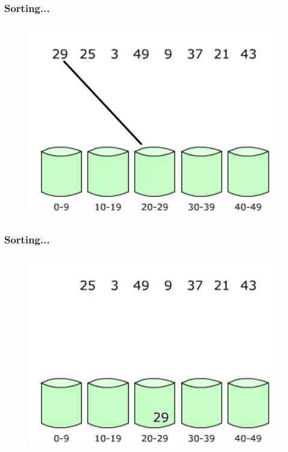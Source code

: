 \documentclass[pdf]{beamer}
\begin{document}
\begin{frame}
	\frametitle{Sorting...}
	\begin{figure}
		\includegraphics[scale=.3]{Figure/1.png}
	\end{figure}	
\end{frame}

\begin{frame}
	\frametitle{Sorting...}
	\begin{figure}
		\includegraphics[scale=.3]{Figure/2.png}
	\end{figure}	
\end{frame}
\end{document}
